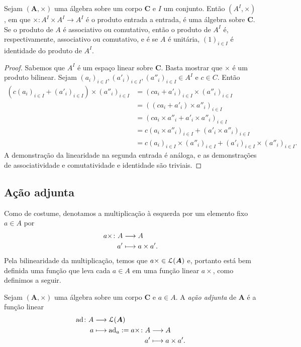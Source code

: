 \begin{proposition}
Sejam $(\bm A,\times)$ uma álgebra sobre um corpo $\bm C$ e $I$ um conjunto. Então $(A^I,\times)$, em que $\times\colon A^I \times A^I \to A^I$ é o produto entrada a entrada, é uma álgebra sobre $\bm C$. Se o produto de $A$ é associativo ou comutativo, então o produto de $A^I$ é, respectivamente, associativo ou comutativo, e é se $A$ é unitária, $(1)_{i \in I}$ é identidade do produto de $A^I$.
\end{proposition}
\begin{proof}
Sabemos que $A^I$ é um espaço linear sobre $\bm C$. Basta mostrar que $\times$ é um produto bilinear. Sejam $(a_i)_{i \in I},(a'_i)_{i \in I},(a''_i)_{i \in I} \in A^I$ e $c \in C$. Então
	\begin{align*}
	(c(a_i)_{i \in I} + (a'_i)_{i \in I}) \times (a''_i)_{i \in I} &= (ca_i + a'_i)_{i \in I} \times (a''_i)_{i \in I} \\
	&= ((ca_i + a'_i) \times a''_i)_{i \in I} \\
	&= (ca_i \times a''_i + a'_i \times a''_i)_{i \in I} \\
	&= c(a_i \times a''_i)_{i \in I} + (a'_i \times a''_i)_{i \in I} \\
	&= c(a_i)_{i \in I} \times (a''_i)_{i \in I} + (a'_i)_{i \in I} \times (a''_i)_{i \in I}.
	\end{align*}
A demonstração da linearidade na segunda entrada é análoga, e as demonstrações de associatividade e comutatividade e identidade são triviais.
\end{proof}

\subsection{Ação adjunta}

Como de costume, denotamos a multiplicação à esquerda por um elemento fixo $a \in A$ por
	\begin{align*}
	{a\times}\colon {A} &\longrightarrow {A} \\{a'} &\longmapsto a \times a'.
	\end{align*}
Pela bilinearidade da multiplicação, temos que $a\times \in \mathcal{L}(\bm A)$ e, portanto está bem definida uma função que leva cada $a \in A$ em uma função linear $a\times$, como definimos a seguir.

\begin{definition}
Sejam $(\bm A,\times)$ uma álgebra sobre um corpo $\bm C$ e $a \in A$. A \emph{ação adjunta} de $\bm A$ é a função linear
	\begin{align*}
	\func{\adj}{A}{\lin(\bm A)}{a}{
		\adj_a :=
		\begin{aligned}[t]
		\func{a\times}{A}{A}{a'}{a \times a'}.
		\end{aligned}
	}
	\end{align*}
\end{definition}

